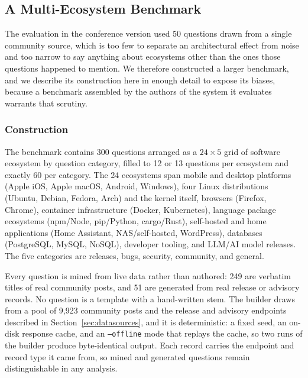 
\subsection{A Multi-Ecosystem Benchmark}\label{sec:benchmark}

The evaluation in the conference version used 50 questions drawn from a single
community source, which is too few to separate an architectural effect from
noise and too narrow to say anything about ecosystems other than the ones those
questions happened to mention. We therefore constructed a larger benchmark, and
we describe its construction here in enough detail to expose its biases, because
a benchmark assembled by the authors of the system it evaluates warrants that
scrutiny.

\subsubsection{Construction}

The benchmark contains 300 questions arranged as a $24 \times 5$ grid of
software ecosystem by question category, filled to 12 or 13 questions per
ecosystem and exactly 60 per category. The 24 ecosystems span mobile and desktop
platforms (Apple iOS, Apple macOS, Android, Windows), four Linux distributions
(Ubuntu, Debian, Fedora, Arch) and the kernel itself, browsers (Firefox,
Chrome), container infrastructure (Docker, Kubernetes), language package
ecosystems (npm/Node, pip/Python, cargo/Rust), self-hosted and home applications
(Home Assistant, NAS/self-hosted, WordPress), databases (PostgreSQL, MySQL,
NoSQL), developer tooling, and LLM/AI model releases. The five categories are
releases, bugs, security, community, and general.

Every question is mined from live data rather than authored: 249 are verbatim
titles of real community posts, and 51 are generated from real release or
advisory records. No question is a template with a hand-written stem. The
builder draws from a pool of 9,923 community posts and the release and advisory
endpoints described in Section~\ref{sec:datasources}, and it is deterministic:
a fixed seed, an on-disk response cache, and an \texttt{--offline} mode that
replays the cache, so two runs of the builder produce byte-identical output.
Each record carries the endpoint and record type it came from, so mined and
generated questions remain distinguishable in any analysis.


